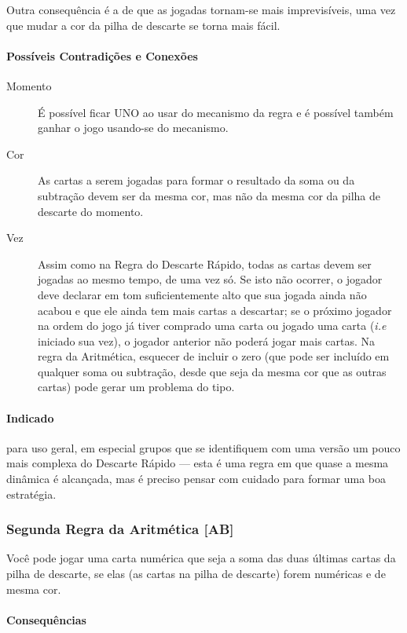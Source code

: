 Outra consequência é a de que as jogadas tornam-se mais imprevisíveis, uma vez que mudar a cor da pilha de descarte se torna mais fácil.

\paragraph{Possíveis Contradições e Conexões}

\begin{description}
\item[Momento]{É possível ficar UNO ao usar do mecanismo da regra e é possível também ganhar o jogo usando-se do mecanismo.}
\item[Cor]{As cartas a serem jogadas para formar o resultado da soma ou da subtração devem ser da mesma cor, mas não da mesma cor da pilha de descarte do momento.}
\item[Vez]{Assim como na Regra do Descarte Rápido, todas as cartas devem ser jogadas ao mesmo tempo, de uma vez só. Se isto não ocorrer, o jogador deve declarar em tom suficientemente alto que sua jogada ainda não acabou e que ele ainda tem mais cartas a descartar; se o próximo jogador na ordem do jogo já tiver comprado uma carta ou jogado uma carta (\emph{i.e} iniciado sua vez), o jogador anterior não poderá jogar mais cartas. Na regra da Aritmética, esquecer de incluir o zero (que pode ser incluído em qualquer soma ou subtração, desde que seja da mesma cor que as outras cartas) pode gerar um problema do tipo.}
\end{description}

\paragraph{Indicado} 

para uso geral, em especial grupos que se identifiquem com uma versão um pouco mais complexa do Descarte Rápido --- esta é uma regra em que quase a mesma dinâmica é alcançada, mas é preciso pensar com cuidado para formar uma boa estratégia.

\subsubsection{Segunda Regra da Aritmética [AB]}

Você pode jogar uma carta numérica que seja a soma das duas últimas cartas da pilha de descarte, se elas (as cartas na pilha de descarte) forem numéricas e de mesma cor.

\paragraph{Consequências}

